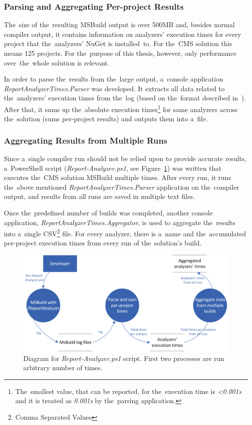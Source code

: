 \documentclass[
  digital, %
  table,   %
  lof,     %
  lot,     %
  oneside,
]{fithesis3}
\begin{document}
\subsubsection{\textbf{Parsing and Aggregating Per-project Results}}
The~size of the~resulting MSBuild output is over 500MB and, besides normal compiler output, it contains information on analyzers' execution times for every project that the~analyzers' NuGet is installed~to. For the~CMS solution this means 125 projects. For the~purpose of this thesis, however, only performance over~the~whole solution is relevant. 

In order to parse the~results from the~large output, a~console application \textit{ReportAnalyzerTimes.Parser} was developed. It extracts all data related to the~analyzers' execution times from the~log (based on the~format described in~\cite{report-analyzer}). After that, it sums up the~absolute execution times\footnote{The~smallest value, that can be reported, for the~execution time is \textit{<0.001s} and it is treated as \textit{0.001s} by the~parsing application.} for same analyzers across the~solution (sums per-project results) and outputs them into a~file.

\subsubsection{\textbf{Aggregating Results from Multiple Runs}}
Since a~single compiler run should not be relied upon to provide accurate results, a~PowerShell script (\textit{Report-Analyzer.ps1}, see Figure~\ref{fig:uml-report-analyzer-dfd}) was written that executes the~CMS solution MSBuild multiple times. After every run, it runs the~above mentioned \textit{ReportAnalyzerTimes.Parser} application on the~compiler output, and results from all runs are saved in multiple text files. 

Once the~predefined number of builds was completed, another console application, \textit{ReportAnalyzerTimes.Aggregator}, is used to aggregate the~results into a~single CSV\footnote{Comma Separated Values} file. For every analyzer, there is a~name and the~accumulated per-project execution times from every run of the~solution's build.

\begin{figure}[h!]
		\centering
			\includegraphics[scale=0.98]{img/uml/report-analyzer-dfd}
		\caption{Diagram for \textit{Report-Analyzer.ps1} script. First two processes are run arbitrary number of times.}
		\label{fig:uml-report-analyzer-dfd}
\end{figure}
\end{document}
